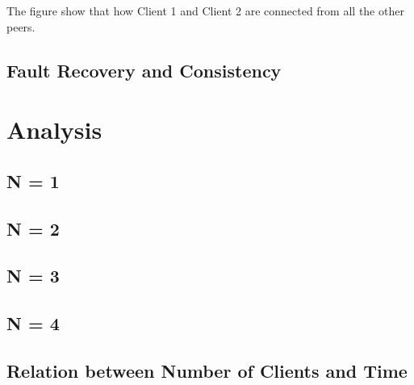 \documentclass[12pt]{scrartcl}
\begin{document}
\par The figure show that how Client 1 and Client 2 are connected from all the other peers.\\

\subsection{Fault Recovery and Consistency}
\section{Analysis}
\subsection{N = 1}
\subsection{N = 2}
\subsection{N = 3}
\subsection{N = 4}
\subsection{Relation between Number of Clients and Time}
\end{document}
